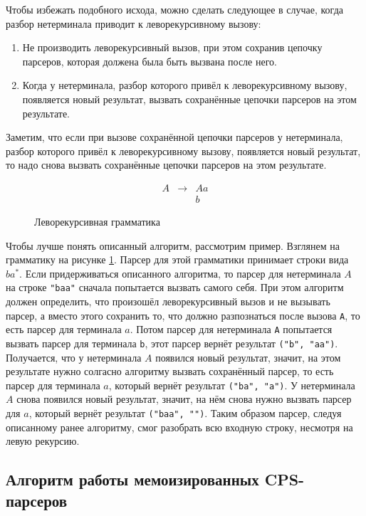 \documentclass[times]{itmo-student-thesis}
\begin{document}
Чтобы избежать подобного исхода, можно сделать следующее в случае, когда разбор нетерминала приводит к леворекурсивному вызову:
\begin{enumerate}
    \item Не производить леворекурсивный вызов, при этом сохранив цепочку парсеров, которая должена была быть вызвана после него.
    \item Когда у нетерминала, разбор которого привёл к леворекурсивному вызову, появляется новый результат, вызвать сохранённые цепочки парсеров
          на этом результате.
\end{enumerate}
Заметим, что если при вызове сохранённой цепочки парсеров у нетерминала, разбор которого привёл к леворекурсивному вызову,
появляется новый результат, то надо снова вызвать сохранённые цепочки парсеров на этом результате. 

\begin{figure}[!h]
  \caption{Леворекурсивная грамматика}\label{leftrec_grammar_cps}
  \[
      \begin{array}{lll}
          A & \to & Aa \\
            &     & b
      \end{array}
  \]
\end{figure}

Чтобы лучше понять описанный алгоритм, рассмотрим пример. Взглянем на грамматику на рисунке \ref{leftrec_grammar_cps}.
Парсер для этой грамматики принимает строки вида $ba^*$. Если придерживаться описанного алгоритма, то
парсер для нетерминала $A$ на строке \lstinline{"baa"} сначала попытается вызвать самого себя.
При этом алгоритм должен определить, что произошёл леворекурсивный вызов и не вызывать парсер, а вместо этого сохранить то, что
должно разпознаться после вызова \lstinline{A}, то есть парсер для терминала $a$. Потом
парсер для нетерминала \lstinline{A} попытается вызвать парсер для терминала \lstinline{b}, этот парсер вернёт результат
\lstinline{("b", "aa")}. Получается, что у нетерминала $A$ появился новый результат, значит, на этом
результате нужно солгасно алгоритму вызвать сохранённый парсер, то есть парсер для терминала $a$,
который вернёт результат \lstinline{("ba", "a")}. У нетерминала $A$ снова появился новый результат,
значит, на нём снова нужно вызвать парсер для $a$, который вернёт результат \lstinline{("baa", "")}.
Таким образом парсер, следуя описанному ранее алгоритму, смог разобрать всю входную строку, несмотря на левую рекурсию.

\subsection{Алгоритм работы мемоизированных CPS-парсеров}\label{sec:cps_algorithm}
\end{document}
